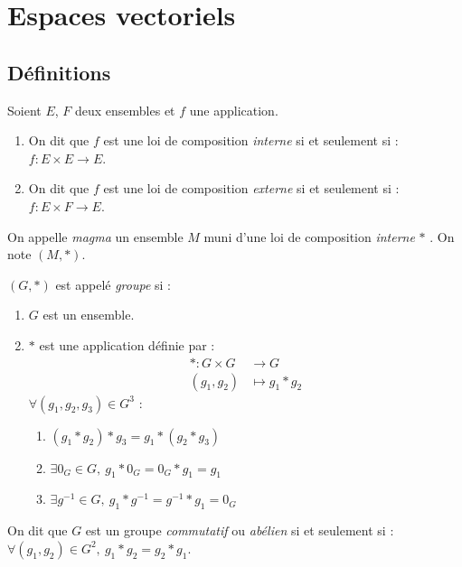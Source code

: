 \chapter{Espaces vectoriels}\label{chap:espaces_vectoriels}

\section{Définitions}
\begin{definition}
	Soient $E$, $F$ deux ensembles et $f$ une application.
	\begin{enumerate}
		\item On dit que $f$ est une loi de composition \emph{interne} si et seulement si : $f : E \times E \to E$.
		\item On dit que $f$ est une loi de composition \emph{externe} si et seulement si : $f : E \times F \to E$.
	\end{enumerate}
\end{definition}

\begin{definition}[Magma]
	On appelle \emph{magma} un ensemble $M$ muni d'une loi de composition \emph{interne} \og $*$ \fg. On note $(M, *)$.
\end{definition}

\begin{definition}[Groupe]
    $(G, *)$ est appelé \emph{groupe} si :
    \begin{enumerate}
        \item $G$ est un ensemble.
        \item \og $*$ \fg est une application définie par :
        \begin{align*}
            * : G \times G &\to G \\
            (g_1, g_2) &\mapsto g_1 * g_2
        \end{align*}
        $\forall (g_1, g_2, g_3) \in G^3$ :
        \begin{multicols}{2}
            \begin{enumerate}
                \item $(g_1 * g_2) * g_3 = g_1 * (g_2 * g_3)$
                \item $\exists 0_G \in G,\ g_1 * 0_G = 0_G * g_1 = g_1$
                \item $\exists g^{-1} \in G,\ g_1 * g^{-1} = g^{-1} * g_1 = 0_G$
            \end{enumerate}
        \end{multicols}
    \end{enumerate}
	On dit que $G$ est un groupe \emph{commutatif} ou \emph{abélien} si et seulement si : $\forall (g_1, g_2) \in G^2,\ g_1 * g_2 = g_2 * g_1$.
\end{definition}

